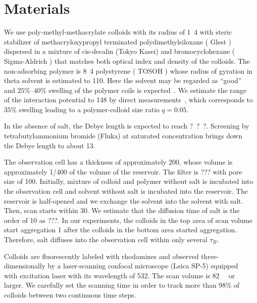 \section{Materials} %
We use poly-methyl-methacrylate colloids with its radius of \unit{1.4}{\micro\metre} with steric stabilizer of methacryloxypropyl terminated polydimethylsiloxane ( Glest ) dispersed in a mixture of cis-decalin (Tokyo Kasei) and bromocyclohexane ( Sigma-Aldrich ) that matches both optical index and density of the colloids.
The non-adsorbing polymer is \unit{8.4}{\mega\dalton} polystyrene ( TOSOH ) whose radius of gyration in theta solvent is estimated to \unit{110}{\nano\metre}. 
Here the solvent may be regarded as ``good'' and $25\%–40\%$ swelling of the polymer coils is expected~\cite{Royall2007}. We estimate the range of the interaction potential to \unit{148}{\nano\metre} by direct measurements~\cite{Royall2007}, which corresponds to $35\%$ swelling leading to a polymer-colloid size ratio $q=0.05$.

In the absence of salt, the Debye length is expected to reach \unit{???}{\nano\metre}.
Screening by tetrabutylammonium bromide (Fluka) at saturated concentration  brings down the Debye length to about \unit{13}{\nano\metre}.

The observation cell has a thickness of approximately \unit{200}{\micro\metre}, whose volume is approximately 1/400 of the volume of the reservoir.
The filter is ??? with pore size of \unit{100}{\nano\metre}.
Initially, mixture of colloid and polymer without salt is incubated into the observation cell and solvent without salt is incubated into the reservoir.
The reservoir is half-opened and we exchange the solvent into the solvent with salt.
Then, scan starts within \unit{30}{\second}.
We estimate that the diffusion time of salt is the order of \unit{10}{\second} as ???.
In our experiments, the colloids in the top area of scan volume start aggregation \unit{1}{\min} after the colloids in the bottom area started aggregation.
Therefore, salt diffuses into the observation cell within only several $\tau_B$.

Colloids are fluorescently labeled with rhodamines  and observed three-dimensionally by a laser-scanning confocal microscope (Leica SP-5) equipped with excitation laser with its wavelength of \unit{532}{\nano\metre}.
The scan volume is \unit{82  }{\micro\metre} or larger.
We carefully set the scanning time in order to track more than \unit{98}\% of colloids between two continuous time steps.


